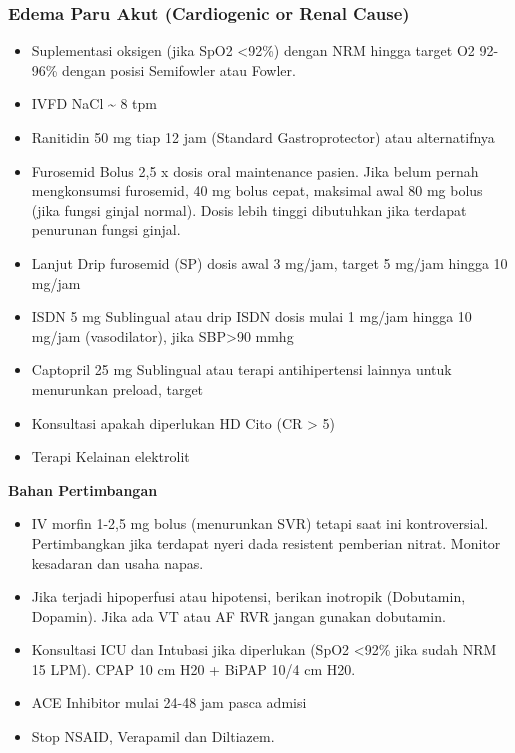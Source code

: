 \documentclass[
]{book}
\providecommand{\tightlist}{%
  \setlength{\itemsep}{0pt}\setlength{\parskip}{0pt}}
\begin{document}
\hypertarget{edema-paru-akut-cardiogenic-or-renal-cause}{%
\subsubsection{Edema Paru Akut (Cardiogenic or Renal Cause)}\label{edema-paru-akut-cardiogenic-or-renal-cause}}

\begin{itemize}
\tightlist
\item
  Suplementasi oksigen (jika SpO2 \textless92\%) dengan NRM hingga target O2 92-96\% dengan posisi Semifowler atau Fowler.
\item
  IVFD NaCl \textasciitilde{} 8 tpm
\item
  Ranitidin 50 mg tiap 12 jam (Standard Gastroprotector) atau alternatifnya
\item
  Furosemid Bolus 2,5 x dosis oral maintenance pasien. Jika belum pernah mengkonsumsi furosemid, 40 mg bolus cepat, maksimal awal 80 mg bolus (jika fungsi ginjal normal). Dosis lebih tinggi dibutuhkan jika terdapat penurunan fungsi ginjal.
\item
  Lanjut Drip furosemid (SP) dosis awal 3 mg/jam, target 5 mg/jam hingga 10 mg/jam
\item
  ISDN 5 mg Sublingual atau drip ISDN dosis mulai 1 mg/jam hingga 10 mg/jam (vasodilator), jika SBP\textgreater90 mmhg
\item
  Captopril 25 mg Sublingual atau terapi antihipertensi lainnya untuk menurunkan preload, target
\item
  Konsultasi apakah diperlukan HD Cito (CR \textgreater{} 5)
\item
  Terapi Kelainan elektrolit
\end{itemize}

\textbf{Bahan Pertimbangan}

\begin{itemize}
\tightlist
\item
  IV morfin 1-2,5 mg bolus (menurunkan SVR) tetapi saat ini kontroversial. Pertimbangkan jika terdapat nyeri dada resistent pemberian nitrat. Monitor kesadaran dan usaha napas.
\item
  Jika terjadi hipoperfusi atau hipotensi, berikan inotropik (Dobutamin, Dopamin). Jika ada VT atau AF RVR jangan gunakan dobutamin.
\item
  Konsultasi ICU dan Intubasi jika diperlukan (SpO2 \textless92\% jika sudah NRM 15 LPM). CPAP 10 cm H20 + BiPAP 10/4 cm H20.
\item
  ACE Inhibitor mulai 24-48 jam pasca admisi
\item
  Stop NSAID, Verapamil dan Diltiazem.
\end{itemize}
\end{document}
